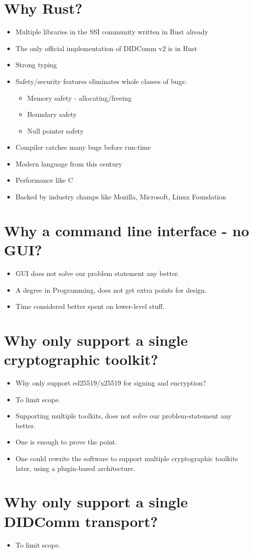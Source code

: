 \section{Why Rust?}
\begin{itemize}
\item Multiple libraries in the SSI community written in Rust already
\item The only official implementation of DIDComm v2 is in Rust
\item Strong typing
\item Safety/security features eliminates whole classes of bugs:
    \begin{itemize}
    \item Memory safety - allocating/freeing
    \item Boundary safety
    \item Null pointer safety
    \end{itemize}
\item Compiler catches many bugs before run-time
\item Modern language from this century
\item Performance like C
\item Backed by industry champs like Mozilla, Microsoft, Linux Foundation
\end{itemize}



\section{Why a command line interface - no GUI?}

\begin{itemize}
\item GUI does not solve our problem statement any better.
\item A degree in Programming, does not get extra points for design.
\item Time considered better spent on lower-level stuff.
\end{itemize}



\section{Why only support a single cryptographic toolkit?}
\begin{itemize}

    \item Why only support ed25519/x25519 for signing and encryption?
    \item To limit scope.
    \item Supporting multiple toolkits, does not solve our problem-statement any better.
    \item One is enough to prove the point.
    \item One could rewrite the software to support multiple cryptographic toolkits later, using a plugin-based architecture.
\end{itemize}



\section{Why only support a single DIDComm transport?}
\begin{itemize}
    \item To limit scope.
\end{itemize}
